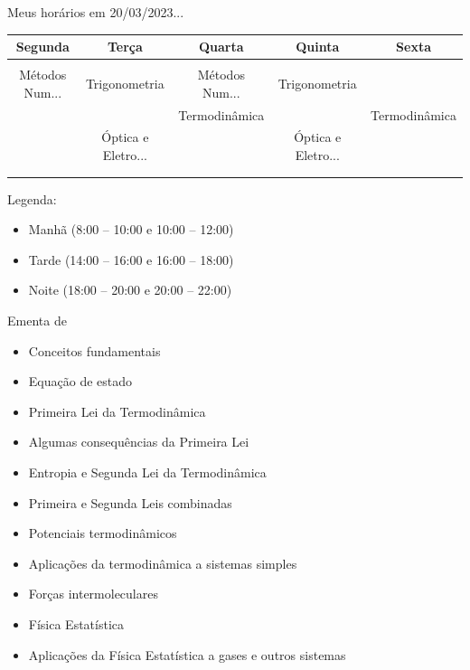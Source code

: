 \begin{frame}{Meus horários em 20/03/2023...}
    \small{
        \begin{center}
            \begin{tabular}{ccccc}
                \rowcolor{black!10} Segunda & Terça & Quarta & Quinta & Sexta \\ \hline
                \rowcolor{red!25} &&&& \\ \hline
                \rowcolor{red!25} Métodos Num... & Trigonometria & Métodos Num... & Trigonometria & \\ \hline
                \rowcolor{green!25} & & Termodinâmica & & Termodinâmica \\ \hline
                \rowcolor{green!25} & Óptica e Eletro... & & Óptica e Eletro... & \\ \hline
                \rowcolor{blue!25} &&&& \\ \hline
                \rowcolor{blue!25} &&&& \\ \hline
            \end{tabular}
        \end{center}

        \vspace{1cm}
        Legenda:
        \begin{itemize}
            \item[\textcolor{red!25}{\rule{1em}{1em}}] Manhã (8:00 -- 10:00 e 10:00 -- 12:00)
            \item[\textcolor{green!25}{\rule{1em}{1em}}] Tarde (14:00 -- 16:00 e 16:00 -- 18:00)
            \item[\textcolor{blue!25}{\rule{1em}{1em}}] Noite (18:00 -- 20:00 e 20:00 -- 22:00)
        \end{itemize}
    }
\end{frame}

\begin{frame}[label=ementa]{Ementa de \Disciplina}
    \begin{itemize}
        \item Conceitos fundamentais
        \item Equação de estado
        \item Primeira Lei da Termodinâmica
        \item Algumas consequências da Primeira Lei
        \item Entropia e Segunda Lei da Termodinâmica
        \item Primeira e Segunda Leis combinadas
        \item Potenciais termodinâmicos
        \item Aplicações da termodinâmica a sistemas simples
        \item Forças intermoleculares
        \item Física Estatística
        \item Aplicações da Física Estatística a gases e outros sistemas
    \end{itemize}
\end{frame}

